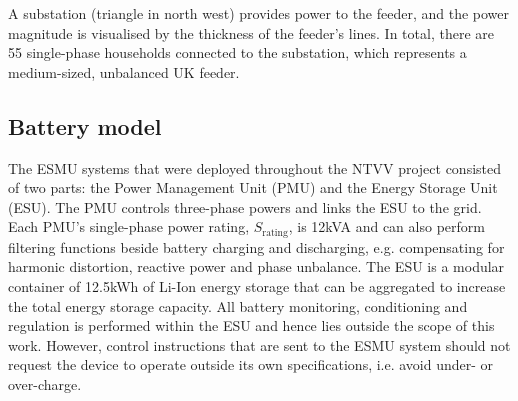 

A substation (triangle in north west) provides power to the feeder, and the power magnitude is visualised by the thickness of the feeder's lines.
In total, there are 55 single-phase households connected to the substation, which represents a medium-sized, unbalanced UK feeder.

\subsection{Battery model}
\label{ch1:subsec:battery-model}


The ESMU systems that were deployed throughout the NTVV project consisted of two parts: the Power Management Unit (PMU) and the Energy Storage Unit (ESU).
The PMU controls three-phase powers and links the ESU to the grid.
Each PMU's single-phase power rating, $S_\text{rating}$, is 12kVA and can also perform filtering functions beside battery charging and discharging, e.g. compensating for harmonic distortion, reactive power and phase unbalance.
The ESU is a modular container of 12.5kWh of Li-Ion energy storage that can be aggregated to increase the total energy storage capacity.
All battery monitoring, conditioning and regulation is performed within the ESU and hence lies outside the scope of this work.
However, control instructions that are sent to the ESMU system should not request the device to operate outside its own specifications, i.e. avoid under- or over-charge.

\nomenclature[I]{$\eta$}{Round-trip efficiency of power electronics, where $\eta \in (0, 1]$}

